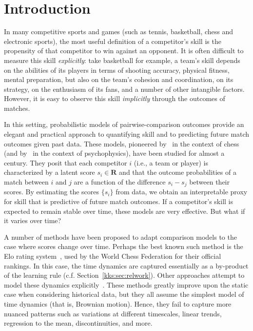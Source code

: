 \section{Introduction}
\label{kks:sec:intro}

In many competitive sports and games (such as tennis, basketball, chess and electronic sports), the most useful definition of a competitor's skill is the propensity of that competitor to win against an opponent.
It is often difficult to measure this skill \emph{explicitly}:
take basketball for example, a team's skill depends on the abilities of its players in terms of shooting accuracy, physical fitness, mental preparation, but also on the team's cohesion and coordination, on its strategy, on the enthusiasm of its fans, and a number of other intangible factors.
However, it is easy to observe this skill \emph{implicitly} through the outcomes of matches.

In this setting, probabilistic models of pairwise-comparison outcomes provide an elegant and practical approach to quantifying skill and to predicting future match outcomes given past data.
These models, pioneered by~\citet{zermelo1928berechnung} in the context of chess (and by~\citet{thurstone1927law} in the context of psychophysics), have been studied for almost a century.
They posit that each competitor $i$ (i.e., a team or player) is characterized by a latent score $s_i \in \mathbf{R}$ and that the outcome probabilities of a match between $i$ and $j$ are a function of the difference $s_i - s_j$ between their scores.
By estimating the scores $\{ s_i \}$ from data, we obtain an interpretable proxy for skill that is predictive of future match outcomes.
If a competitor's skill is expected to remain stable over time, these models are very effective.
But what if it varies over time?

A number of methods have been proposed to adapt comparison models to the case where scores change over time.
Perhaps the best known such method is the Elo rating system~\citep{elo1978rating}, used by the World Chess Federation for their official rankings.
In this case, the time dynamics are captured essentially as a by-product of the learning rule (c.f. Section~\ref{kks:sec:relwork}).
Other approaches attempt to model these dynamics explicitly~\citep[e.g.,][]{fahrmeir1994dynamic, glickman1999parameter, dangauthier2007trueskill, coulom2008whole}.
These methods greatly improve upon the static case when considering historical data, but they all assume the simplest model of time dynamics (that is, Brownian motion).
Hence, they fail to capture more nuanced patterns such as variations at different timescales, linear trends, regression to the mean, discontinuities, and more.

